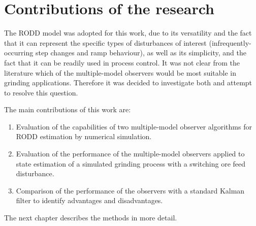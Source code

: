 \section{Contributions of the research} \label{sec:contributions}

The \gls{RODD} model was adopted for this work, due to its versatility and the fact that it can represent the specific types of disturbances of interest (infrequently-occurring step changes and ramp behaviour), as well as its simplicity, and the fact that it can be readily used in process control. It was not clear from the literature which of the multiple-model observers would be most suitable in grinding applications. Therefore it was decided to investigate both and attempt to resolve this question.

The main contributions of this work are:
\begin{enumerate}
	\item Evaluation of the capabilities of two multiple-model observer algorithms for \gls{RODD} estimation by numerical simulation.
	\item Evaluation of the performance of the multiple-model observers applied to state estimation of a simulated grinding process with a switching ore feed disturbance.
	\item Comparison of the performance of the observers with a standard Kalman filter to identify advantages and disadvantages.
\end{enumerate}

The next chapter describes the methods in more detail.


